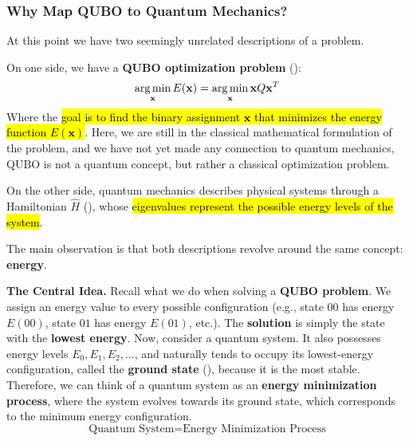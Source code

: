 \subsubsection{Why Map QUBO to Quantum Mechanics?}\label{sec:why-map-qubo-to-quantum-mechanics}

At this point we have two seemingly unrelated descriptions of a problem.

\highspace
On one side, we have a \textbf{QUBO optimization problem} ():
\begin{equation*}
    \operatorname*{arg\,min}_{\mathbf{x}} E(\mathbf{x}) = \operatorname*{arg\,min}_{\mathbf{x}} \mathbf{x} Q \mathbf{x}^T
\end{equation*}
Where the \hl{goal is to find the binary assignment $\mathbf{x}$ that minimizes the energy function $E(\mathbf{x})$}. Here, we are still in the classical mathematical formulation of the problem, and we have not yet made any connection to quantum mechanics, QUBO is not a quantum concept, but rather a classical optimization problem.

\highspace
On the other side, quantum mechanics describes physical systems through a Hamiltonian $\hat{H}$ (), whose \hl{eigenvalues represent the possible energy levels of the system}.

\highspace
The main observation is that both descriptions revolve around the same concept: \textbf{energy}.

\highspace
\textcolor{Green3}{ \textbf{The Central Idea.}} Recall what we do when solving a \textbf{QUBO problem}. We assign an energy value to every possible configuration (e.g., state $00$ has energy $E(00)$, state $01$ has energy $E(01)$, etc.). The \textbf{solution} is simply the state with the \textbf{lowest energy}. Now, consider a quantum system. It also possesses energy levels $E_0, E_1, E_2, \ldots$, and naturally tends to occupy its lowest-energy configuration, called the \textbf{ground state} (), because it is the most stable. Therefore, we can think of a quantum system as an \textbf{energy minimization process}, where the system evolves towards its ground state, which corresponds to the minimum energy configuration.
\begin{equation*}
    \text{Quantum System} = \text{Energy Minimization Process}
\end{equation*}

